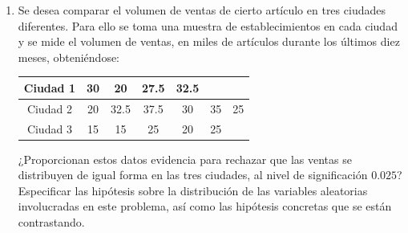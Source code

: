 \documentclass[12pt]{article}
\begin{document}
\begin{ejercicio}
\begin{enumerate}[label=\alph*)]
\begin{enumerate}[label=\alph*)]
                    Si suponemos también que las observaciones son independientes, entonces
                    $\varepsilon_1, \ldots, \varepsilon_n$ son independientes, centradas
                    y homocedásticas, luego el modelo cumple las hipótesis de Gauss-Markov 
                    (modelo lineal de efectos fijos y con las componentes de $\varepsilon$,
                    $\varepsilon_1, \ldots, \varepsilon_n$, variables aleatorias de segundo orden 
                    centradas, homocedásticas e incorreladas), y además es de rango máximo.
                \end{enumerate}
            \item Se desea comparar el volumen de ventas de cierto artículo en tres ciudades diferentes. 
            Para ello se toma una muestra de establecimientos en cada ciudad y se mide el volumen de ventas, 
            en miles de artículos durante los últimos diez meses, obteniéndose:
                \begin{table}[H]
                \centering
                \begin{tabular}{c|cccccc}
                    Ciudad 1 & 30 & 20 & 27.5 & 32.5 & &\\
                    \hline
                    Ciudad 2 & 20 & 32.5 & 37.5 & 30 & 35 & 25 \\
                    \hline
                    Ciudad 3 & 15 & 15 & 25 & 20 & 25 & 
                \end{tabular}
                \end{table}
                ¿Proporcionan estos datos evidencia para rechazar que las ventas se distribuyen de igual 
                forma en las tres ciudades, al nivel de significación $0.025$? 
                Especificar las hipótesis sobre la distribución de las variables aleatorias 
                involucradas en este problema, así como las hipótesis concretas que se están contrastando. \\


\end{enumerate}
\end{ejercicio}
\end{document}
